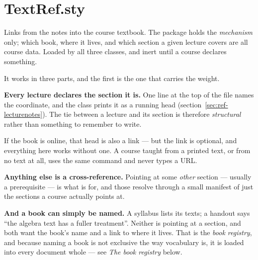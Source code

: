 \section{TextRef.sty}\label{sec:ref-textref}

Links from the notes into the course textbook. The package holds the
\emph{mechanism} only; which book, where it lives, and which section a
given lecture covers are all course data. Loaded by all three classes,
and inert until a course declares something.

It works in three parts, and the first is the one that carries the weight.

\textbf{Every lecture declares the section it is.} One line at the top of
the file names the coordinate, and the class prints it as a running head
(section~\ref{sec:ref-lecturenotes}). The tie between a lecture and its
section is therefore \emph{structural} rather than something to remember
to write.

If the book is online, that head is also a link --- but the link is
optional, and everything here works without one. A course taught from a
printed text, or from no text at all, uses the same command and never
types a URL.

\textbf{Anything else is a cross-reference.} Pointing at some
\emph{other} section --- usually a prerequisite --- is what
 is for, and those resolve through a small manifest of
just the sections a course actually points at.

\textbf{And a book can simply be named.} A syllabus lists its texts; a
handout says ``the algebra text has a fuller treatment''. Neither is
pointing at a section, and both want the book's name and a link to where
it lives. That is the \emph{book registry}, and because naming a book is
not exclusive the way vocabulary is, it is loaded into every document
whole --- see \emph{The book registry} below.

